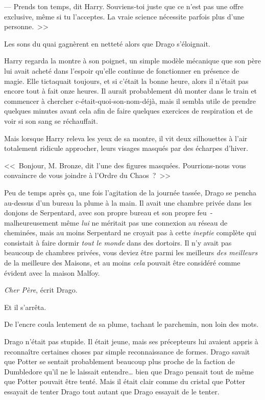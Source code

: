 --- Prends ton temps, dit Harry. Souviens-toi juste que ce n'est pas une offre exclusive, même si tu l'acceptes. La vraie science nécessite parfois plus d'une personne.~>>

Les sons du quai gagnèrent en netteté alors que Drago s'éloignait.

Harry regarda la montre à son poignet, un simple modèle mécanique que son père lui avait acheté dans l'espoir qu'elle continue de fonctionner en présence de magie. Elle tictaquait toujours, et si c'était la bonne heure, alors il n'était pas encore tout à fait onze heures. Il aurait probablement dû monter dans le train et commencer à chercher c-était-quoi-son-nom-déjà, mais il sembla utile de prendre quelques minutes avant cela afin de faire quelques exercices de respiration et de voir si son sang se réchauffait.

Mais lorsque Harry releva les yeux de sa montre, il vit deux silhouettes à l'air totalement ridicule approcher, leurs visages masqués par des écharpes d'hiver.

<<~Bonjour, M. Bronze, dit l'une des figures masquées. Pourrions-nous vous convaincre de vous joindre à l'Ordre du Chaos~?~>>


Peu de temps après ça, une fois l'agitation de la journée tassée, Drago se pencha au-dessus d'un bureau la plume à la main. Il avait une chambre privée dans les donjons de Serpentard, avec son propre bureau et son propre feu~- malheureusement même \emph{lui} ne méritait pas une connexion au réseau de cheminées, mais au moins Serpentard ne croyait pas à cette \emph{ineptie} complète qui consistait à faire dormir \emph{tout le monde} dans des dortoirs. Il n'y avait pas beaucoup de chambres privées, vous deviez être parmi les meilleurs \emph{des meilleurs} de la meilleure des Maisons, et au moins \emph{cela} pouvait être considéré comme évident avec la maison Malfoy.

\emph{Cher Père}, écrit Drago.

Et il s'arrêta.

De l'encre coula lentement de sa plume, tachant le parchemin, non loin des mots.

Drago n'était pas stupide. Il était jeune, mais ses précepteurs lui avaient appris à reconnaître certaines choses par simple reconnaissance de formes. Drago savait que Potter se sentait probablement beaucoup plus proche de la faction de Dumbledore qu'il ne le laissait entendre… bien que Drago pensait tout de même que Potter pouvait être tenté. Mais il était clair comme du cristal que Potter essayait de tenter Drago tout autant que Drago essayait de le tenter.

